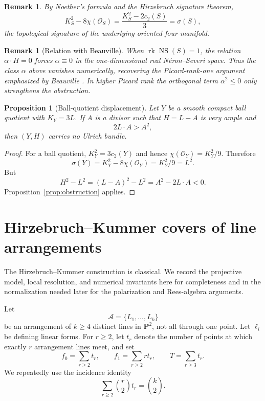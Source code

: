 \documentclass[11pt]{article}
\newtheorem{proposition}[theorem]{Proposition}
\newtheorem{remark}[theorem]{Remark}
\newcommand{\PP}{\mathbf P}
\newcommand{\OO}{\mathcal O}
\newcommand{\cA}{\mathcal A}
\newcommand{\NS}{\operatorname{NS}}
\newcommand{\sig}{\sigma}
\begin{document}
\begin{remark}\label{rem:signature}
By Noether's formula and the Hirzebruch signature theorem,
\[
 K_S^2-8\chi(\OO_S)
   =\frac{K_S^2-2c_2(S)}3
   =\sig(S),
\]
the topological signature of the underlying oriented four-manifold.
\end{remark}

\begin{remark}[Relation with Beauville]\label{rem:beauville-obstruction}
When $\operatorname{rk}\NS(S)=1$, the relation $\alpha\cdot H=0$ forces
$\alpha\equiv0$ in the one-dimensional real N\'eron--Severi space.  Thus the class
$\alpha$ above vanishes numerically, recovering the Picard-rank-one argument emphasized by Beauville
\cite{Beauville2017,Beauville2018}.  In higher Picard rank the orthogonal term
$\alpha^2\le0$ only strengthens the obstruction.
\end{remark}

\begin{proposition}[Ball-quotient displacement]\label{prop:ball-displacement}
Let $Y$ be a smooth compact ball quotient with $K_Y=3L$.  If $A$ is a divisor
such that $H=L-A$ is very ample and
\[
        2L\cdot A>A^2,
\]
then $(Y,H)$ carries no Ulrich bundle.
\end{proposition}

\begin{proof}
For a ball quotient, $K_Y^2=3c_2(Y)$ and hence
$\chi(\OO_Y)=K_Y^2/9$.  Therefore
\[
        \sig(Y)=K_Y^2-8\chi(\OO_Y)=K_Y^2/9=L^2.
\]
But
\[
        H^2-L^2=(L-A)^2-L^2=A^2-2L\cdot A<0.
\]
Proposition~\ref{prop:obstruction} applies.
\end{proof}

\section{Hirzebruch--Kummer covers of line arrangements}\label{sec:kummer}

The Hirzebruch--Kummer construction is classical.  We record the projective model,
local resolution, and numerical invariants here for completeness and in the
normalization needed later for the polarization and Rees-algebra arguments.

Let
\[
        \cA=\{L_1,\ldots,L_k\}
\]
be an arrangement of $k\ge4$ distinct lines in $\PP^2$, not all through one
point.  Let $\ell_i$ be defining linear forms.  For $r\ge2$, let $t_r$ denote
the number of points at which exactly $r$ arrangement lines meet, and set
\[
 f_0=\sum_{r\ge2}t_r,\qquad
 f_1=\sum_{r\ge2}rt_r,\qquad
 T=\sum_{r\ge3}t_r.
\]
We repeatedly use the incidence identity
\begin{equation}\label{eq:pair-identity}
        \sum_{r\ge2}\binom r2 t_r=\binom k2.
\end{equation}
\end{document}
